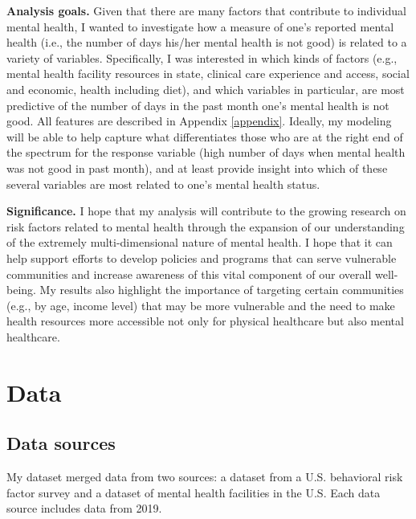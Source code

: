 \documentclass[
]{article}
\begin{document}
\textbf{Analysis goals.} Given that there are many factors that contribute to individual mental health, I wanted to investigate how a measure of one's reported mental health (i.e., the number of days his/her mental health is not good) is related to a variety of variables. Specifically, I was interested in which kinds of factors (e.g., mental health facility resources in state, clinical care experience and access, social and economic, health including diet), and which variables in particular, are most predictive of the number of days in the past month one's mental health is not good. All features are described in Appendix \ref{appendix}. Ideally, my modeling will be able to help capture what differentiates those who are at the right end of the spectrum for the response variable (high number of days when mental health was not good in past month), and at least provide insight into which of these several variables are most related to one's mental health status.

\textbf{Significance.} I hope that my analysis will contribute to the growing research on risk factors related to mental health through the expansion of our understanding of the extremely multi-dimensional nature of mental health. I hope that it can help support efforts to develop policies and programs that can serve vulnerable communities and increase awareness of this vital component of our overall well-being. My results also highlight the importance of targeting certain communities (e.g., by age, income level) that may be more vulnerable and the need to make health resources more accessible not only for physical healthcare but also mental healthcare.

\hypertarget{data}{%
\section{Data}\label{data}}

\hypertarget{data-sources}{%
\subsection{Data sources}\label{data-sources}}

My dataset merged data from two sources: a dataset from a U.S. behavioral risk factor survey and a dataset of mental health facilities in the U.S. Each data source includes data from 2019.
\end{document}
